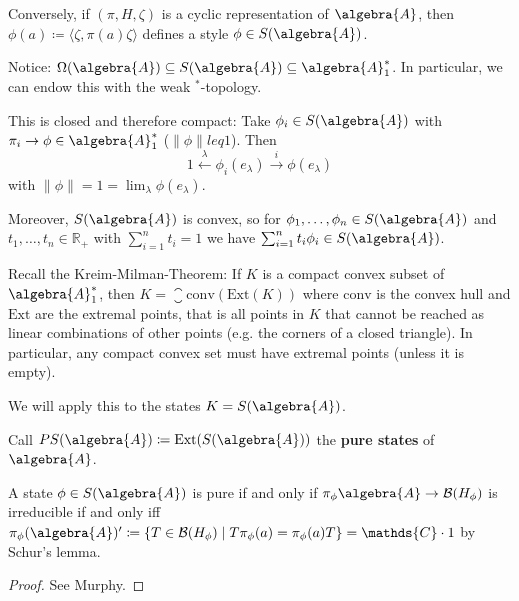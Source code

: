 \documentclass[a4paper]{article}
\begin{document}
Conversely, if $(\pi, H, \zeta)$ is a cyclic representation of $\algebra{A}$, then $\phi(a) \coloneq \langle \zeta, \pi(a) \zeta \rangle$ defines a style $\phi \in S(\algebra{A})$.

\begin{remark}
	Notice: $\Omega(\algebra{A}) \subseteq S(\algebra{A}) \subseteq \algebra{A}_1^*$.
	In particular, we can endow this with the weak $^*$-topology.

	This is closed and therefore compact: Take $\phi_i \in S(\algebra{A})$ with $\pi_i \to \phi \in \algebra{A}^*_1$ ($\|\phi\| leq 1$). Then 
	\begin{equation*}
		1 \xleftarrow{\lambda}\phi_i(e_\lambda) \xrightarrow{i} \phi(e_\lambda)
	\end{equation*}
	with $\|\phi\| = 1 = \lim_\lambda \phi(e_\lambda)$.

	Moreover, $S(\algebra{A})$ is convex, so for $\phi_1, \dots, \phi_n \in S(\algebra{A})$ and $t_1, \dots, t_n \in \mathds{R}_+$ with $\sum_{i = 1}^{n} t_i = 1$ we have $\sum_{i = 1}^{n} t_i \phi_i \in S(\algebra{A})$.

	Recall the Kreim-Milman-Theorem: If $K$ is a compact convex subset of $\algebra{A}_1^*$, then $K = \closure{\mathrm{conv}(\mathrm{Ext}(K))}$ where $\mathrm{conv}$ is the convex hull and $\mathrm{Ext}$ are the extremal points, that is all points in $K$ that cannot be reached as linear combinations of other points (e.g. the corners of a closed triangle). 
	In particular, any compact convex set must have extremal points (unless it is empty).

	We will apply this to the states $K = S(\algebra{A})$.
\end{remark}

\begin{definition}
	Call $PS(\algebra{A}) \coloneq \mathrm{Ext}(S(\algebra{A}))$ the \textbf{pure states} of $\algebra{A}$.
\end{definition}

\begin{theorem}
	A state $\phi \in S(\algebra{A})$ is pure if and only if $\pi_\phi \algebra{A} \to \mathcal{B}(H_\phi)$ is irreducible if and only iff $\pi_\phi(\algebra{A})' \coloneq \{ T \in \mathcal{B}(H_\phi) \mid T \pi_\phi(a) = \pi_\phi(a) T \} = \mathds{C} \cdot 1$ by Schur's lemma.
\end{theorem}

\begin{proof}
	See Murphy.
\end{proof}
\end{document}
